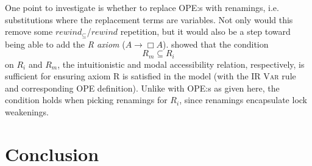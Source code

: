 \documentclass[12pt,twoside,openright]{report}
\numberwithin{equation}{chapter}
\numberwithin{figure}{chapter}
\numberwithin{table}{chapter}
\theoremstyle{definition}\newtheorem{definition}{Definition}
\begin{document}
One point to investigate is whether to replace OPE:s with renamings,
i.e. substitutions where the replacement terms are variables.
Not only would this remove
some $\textit{rewind}_\subseteq$/$\textit{rewind}$ repetition,
but it would also be a step toward being able to add the \emph{R axiom}
($A \to \Box A$).
\textcite{valliappan-r} showed that the condition
$$ R_m \subseteq R_i $$
on $R_i$ and $R_m$,
the intuitionistic and modal accessibility relation, respectively,
is sufficient for ensuring axiom R is satisfied in the model
(with the IR \textsc{Var} rule and corresponding OPE definition).
Unlike with OPE:s as given here,
the condition holds when picking renamings for $R_i$,
since renamings encapsulate lock weakenings.

\chapter{Conclusion}\label{sec:conclusion}

\cleardoublepage
\printbibliography[heading=bibintoc]
\end{document}
